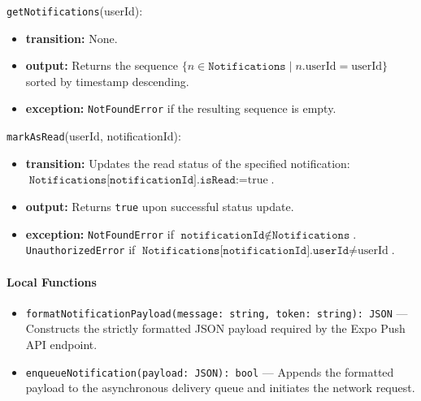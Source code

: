 \texttt{getNotifications}(userId):
\begin{itemize}
    \item \textbf{transition:} None.
    \item \textbf{output:} Returns the sequence $\{n \in \texttt{Notifications} \mid n.\text{userId} = \text{userId}\}$ sorted by timestamp descending.
    \item \textbf{exception:} \texttt{NotFoundError} if the resulting sequence is empty.
\end{itemize}

\texttt{markAsRead}(userId, notificationId):
\begin{itemize}
    \item \textbf{transition:} Updates the read status of the specified notification: $\texttt{Notifications[notificationId].isRead} := \text{true}$.
    \item \textbf{output:} Returns \texttt{true} upon successful status update.
    \item \textbf{exception:} \texttt{NotFoundError} if $\texttt{notificationId} \notin \texttt{Notifications}$. \texttt{UnauthorizedError} if $\texttt{Notifications[notificationId].userId} \neq \text{userId}$.
\end{itemize}

\paragraph{Local Functions}
\begin{itemize}
    \item \texttt{formatNotificationPayload(message: string, token: string): JSON} --- Constructs the strictly formatted JSON payload required by the Expo Push API endpoint.
    \item \texttt{enqueueNotification(payload: JSON): bool} --- Appends the formatted payload to the asynchronous delivery queue and initiates the network request.
\end{itemize}